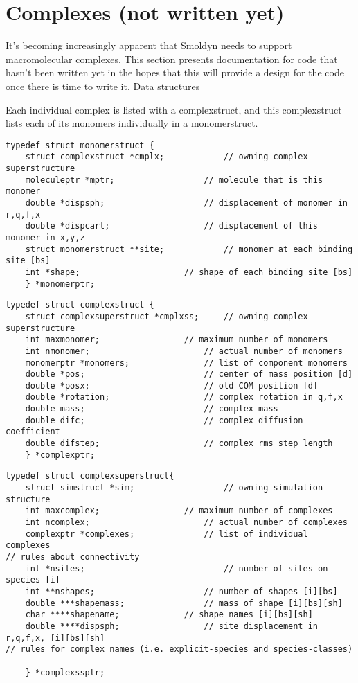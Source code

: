 \documentclass {book}
\begin{document}
\section{Complexes (not written yet)}

It's becoming increasingly apparent that Smoldyn needs to support macromolecular complexes. This section presents documentation for code that hasn't been written yet in the hopes that this will provide a design for the code once there is time to write it.
\newline
\newline
\underline{Data structures}

Each individual complex is listed with a complexstruct, and this complexstruct lists each of its monomers individually in a monomerstruct.

\begin{lstlisting}
typedef struct monomerstruct {
	struct complexstruct *cmplx;			// owning complex superstructure
	moleculeptr *mptr;					// molecule that is this monomer
	double *dispsph;					// displacement of monomer in r,q,f,x
	double *dispcart;					// displacement of this monomer in x,y,z
	struct monomerstruct **site;			// monomer at each binding site [bs]
	int *shape;						// shape of each binding site [bs]
	} *monomerptr;
\end{lstlisting}


\begin{lstlisting}
typedef struct complexstruct {
	struct complexsuperstruct *cmplxss;		// owning complex superstructure
	int maxmonomer;					// maximum number of monomers
	int nmonomer;						// actual number of monomers
	monomerptr *monomers;				// list of component monomers
	double *pos;						// center of mass position [d]
	double *posx;						// old COM position [d]
	double *rotation;					// complex rotation in q,f,x
	double mass;						// complex mass
	double difc;						// complex diffusion coefficient
	double difstep;						// complex rms step length
	} *complexptr;
\end{lstlisting}


\begin{lstlisting}
typedef struct complexsuperstruct{
	struct simstruct *sim;					// owning simulation structure
	int maxcomplex;					// maximum number of complexes
	int ncomplex;						// actual number of complexes
	complexptr *complexes;				// list of individual complexes
// rules about connectivity
	int *nsites;							// number of sites on species [i]
	int **nshapes;						// number of shapes [i][bs]
	double ***shapemass;				// mass of shape [i][bs][sh]
	char ****shapename;				// shape names [i][bs][sh]
	double ****dispsph;					// site displacement in r,q,f,x, [i][bs][sh]
// rules for complex names (i.e. explicit-species and species-classes)
	
	} *complexssptr;
\end{lstlisting}
\end{document}
